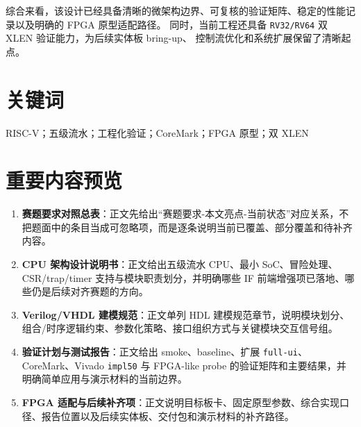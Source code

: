 综合来看，该设计已经具备清晰的微架构边界、可复核的验证矩阵、稳定的性能记录以及明确的 FPGA 原型适配路径。
同时，当前工程还具备 \texttt{RV32/RV64} 双 XLEN 验证能力，为后续实体板 bring-up、
控制流优化和系统扩展保留了清晰起点。

\section*{关键词}

RISC-V；五级流水；工程化验证；CoreMark；FPGA 原型；双 XLEN

\section*{重要内容预览}

\begin{enumerate}
    \item \textbf{赛题要求对照总表}：正文先给出“赛题要求-本文亮点-当前状态”对应关系，不把题面中的条目当成可忽略项，而是逐条说明当前已覆盖、部分覆盖和待补齐内容。
    \item \textbf{CPU 架构设计说明书}：正文给出五级流水 CPU、最小 SoC、冒险处理、CSR/trap/timer 支持与模块职责划分，并明确哪些 IF 前端增强项已落地、哪些仍是后续对齐赛题的方向。
    \item \textbf{Verilog/VHDL 建模规范}：正文单列 HDL 建模规范章节，说明模块划分、组合/时序逻辑约束、参数化策略、接口组织方式与关键模块交互信号组。
    \item \textbf{验证计划与测试报告}：正文给出 smoke、baseline、扩展 \texttt{full-ui}、CoreMark、Vivado \texttt{impl50} 与 FPGA-like probe 的验证矩阵和主要结果，并明确简单应用与演示材料的当前边界。
    \item \textbf{FPGA 适配与后续补齐项}：正文说明目标板卡、固定原型参数、综合实现口径、报告位置以及后续实体板、交付包和演示材料的补齐路径。
\end{enumerate}

